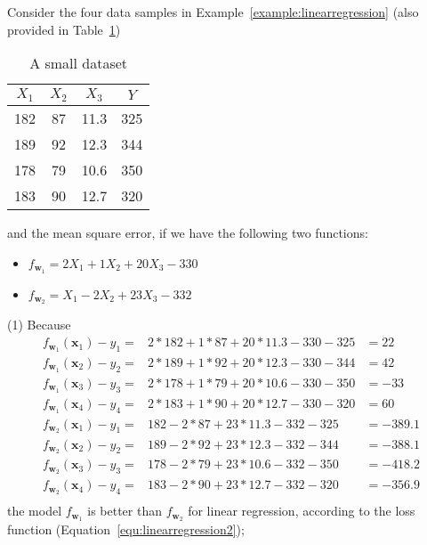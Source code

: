 \begin{example}
Consider the four data samples in Example~\ref{example:linearregression} (also provided in Table~\ref{tab:footballplayers2}) 
\begin{table}[h!]
    \centering
    \begin{tabular}{|c|c|c|c|}
    \hline
      $X_1$   & $X_2$ & $X_3$ & $Y$ \\
      \hline
      182   & 87 & 11.3 & 325 \\
      189   & 92 & 12.3 & 344 \\
      178   & 79 & 10.6 & 350 \\
      183   & 90 & 12.7 & 320 \\
      \hline
    \end{tabular}
    \caption{A small dataset}
    \label{tab:footballplayers2}
\end{table}
and the mean square error, if we have the following two functions: 
\begin{itemize}
    \item $f_{\textbf{w}_1}=2X_1+1X_2+20X_3-330$
    \item $f_{\textbf{w}_2}=X_1-2X_2+23X_3-332$
\end{itemize}

(1) Because 
\begin{equation}
\begin{array}{rll}
    f_{\textbf{w}_1}(\textbf{x}_1)-y_1 = & 2*182+1*87+20*11.3-330-325 & =  22 \\
    f_{\textbf{w}_1}(\textbf{x}_2)-y_2 = & 2*189+1*92+20*12.3-330-344 & =  42 \\
    f_{\textbf{w}_1}(\textbf{x}_3)-y_3 = & 2*178+1*79+20*10.6-330-350 & =  -33 \\
    f_{\textbf{w}_1}(\textbf{x}_4)-y_4 = & 2*183+1*90+20*12.7-330-320 & =  60 \\
    
    f_{\textbf{w}_2}(\textbf{x}_1)-y_1 = & 182-2*87+23*11.3-332-325 & =  -389.1 \\
    f_{\textbf{w}_2}(\textbf{x}_2)-y_2 = & 189-2*92+23*12.3-332-344 & =  -388.1 \\
    f_{\textbf{w}_2}(\textbf{x}_3)-y_3 = & 178-2*79+23*10.6-332-350 & =  -418.2 \\
    f_{\textbf{w}_2}(\textbf{x}_4)-y_4 = & 183-2*90+23*12.7-332-320 & =  -356.9 \\
\end{array}
\end{equation} the model $f_{\textbf{w}_1}$ is better than $f_{\textbf{w}_2}$ for linear regression, according to the loss function (Equation~\ref{equ:linearregression2}); 




\end{example}
